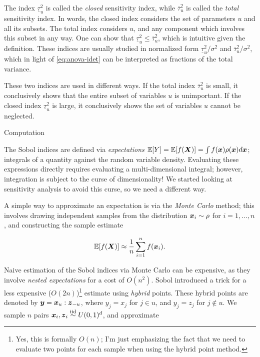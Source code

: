 \documentclass[../primer.tex]{subfiles}
\begin{document}
\noindent The index \(\underline{\tau}_u^2\) is called the \emph{closed} sensitivity
index, while \(\overline{\tau}_u^2\) is called the \emph{total} sensitivity index. In
words, the closed index considers the set of parameters \(u\) and all its subsets.
The total index considers \(u\), and any component which involves this subset in
any way. One can show that \(\underline{\tau}_u^2\leq\overline{\tau}_u^2\), which
is intuitive given the definition. These indices are usually studied in
normalized form \(\underline{\tau}_u^2/\sigma^2\) and
\(\overline{\tau}_u^2/\sigma^2\), which in light of \eqref{eq:anova-idet} can be
interpreted as fractions of the total variance.

These two indices are used in different ways. If the total index
\(\overline{\tau}_u^2\) is small, it conclusively shows that the entire subset of
variables \(u\) is unimportant. If the closed index \(\underline{\tau}_u^2\) is
large, it conclusively shows the set of variables \(u\) cannot be neglected.

Computation

The Sobol indices are defined via \emph{expectations} \(\mathbb{E}[Y]=\mathbb{E}[f(\boldsymbol{X})]=\int
f(\boldsymbol{x})\rho(\boldsymbol{x})d\boldsymbol{x}\); integrals of a quantity against the random variable
density. Evaluating these expressions directly requires evaluating a
multi-dimensional integral; however, integration is subject to the curse of
dimensionality! We started looking at sensitivity analysis to avoid this curse,
so we need a different way.

A simple way to approximate an expectation is via the \emph{Monte Carlo} method; this
involves drawing independent samples from the distribution \(\boldsymbol{x}_i\sim\rho\) for
\(i=1,\dots,n\), and constructing the sample estimate

\begin{equation}
  \mathbb{E}[f(\boldsymbol{X})] \approx \frac{1}{n}\sum_{i=1}^n f(\boldsymbol{x}_i).
\end{equation}

Naive estimation of the Sobol indices via Monte Carlo can be expensive, as they
involve \emph{nested expectations} for a cost of \(O(n^2)\). Sobol \cite{sobol1993}
introduced a trick for a less expensive (\(O(2n)\))\footnote{Yes, this is formally
\(O(n)\); I'm just emphasizing the fact that we need to evaluate two points for
each sample when using the hybrid point method.} estimate using \emph{hybrid} points.
These hybrid points are denoted by \(\boldsymbol{y}=\boldsymbol{x}_u:\boldsymbol{z}_{-u}\), where \(y_j=x_j\) for
\(j\in u\), and \(y_j=z_j\) for \(j\not\in u\). We sample \(n\) pairs
\(\boldsymbol{x}_i,\boldsymbol{z}_i\overset{\text{iid}}{\sim} U(0,1)^d\), and approximate
\end{document}
